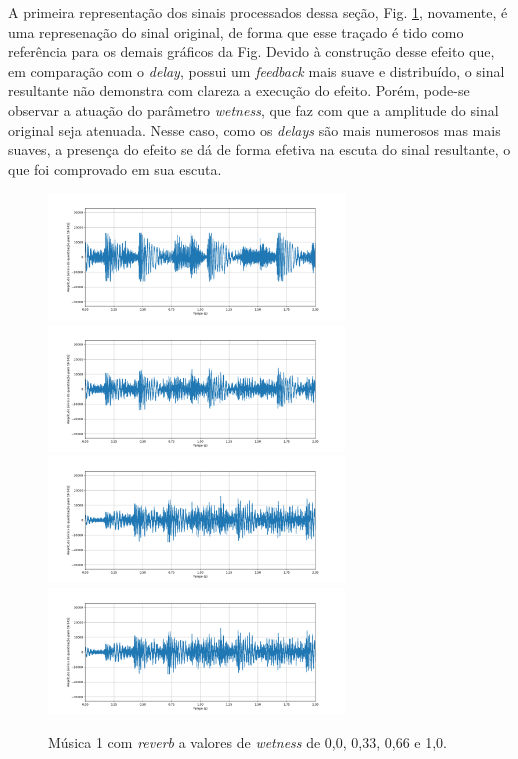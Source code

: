 A primeira representação dos sinais processados dessa seção, Fig. \ref{fig93}, novamente, é uma represenação do sinal original, de forma que esse traçado é tido como referência para os demais gráficos da Fig. %
Devido à construção desse efeito que, em comparação com o \textit{delay}, possui um \textit{feedback} mais suave e distribuído, o sinal resultante não demonstra com clareza a execução do efeito. Porém, pode-se observar a atuação do parâmetro \textit{wetness}, que faz com que a amplitude do sinal original seja atenuada. Nesse caso, como os \textit{delays} são mais numerosos mas mais suaves, a presença do efeito se dá de forma efetiva na escuta do sinal resultante, o que foi comprovado em sua escuta.

\begin{figure}[h]
    \centering
    \includegraphics[width=0.7\textwidth]{figuras/fig93.png}
    \includegraphics[width=0.7\textwidth]{figuras/fig94.png}
    \includegraphics[width=0.7\textwidth]{figuras/fig95.png}
    \includegraphics[width=0.7\textwidth]{figuras/fig95.png}
    \caption{Música 1 com \textit{reverb} a valores de \textit{wetness} de 0,0, 0,33, 0,66 e 1,0.}
    \label{fig93}
\end{figure}



